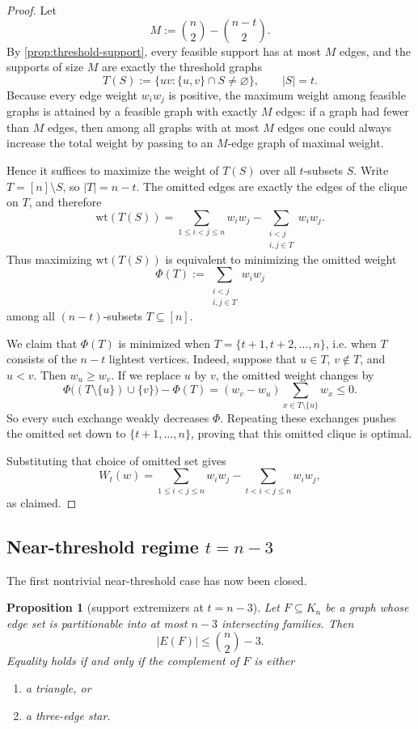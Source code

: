 \documentclass[11pt]{article}
\newtheorem{proposition}[theorem]{Proposition}
\theoremstyle{definition}
\newcommand{\wt}{\mathrm{wt}}
\begin{document}
\begin{proof}
Let
\[
M:=\binom n2-\binom{n-t}{2}.
\]
By \cref{prop:threshold-support}, every feasible support has at most \(M\) edges, and the supports of size \(M\) are exactly the threshold graphs
\[
T(S):=\{uv:\{u,v\}\cap S\neq\varnothing\},
\qquad |S|=t.
\]
Because every edge weight \(w_iw_j\) is positive, the maximum weight among feasible graphs is attained by a feasible graph with exactly \(M\) edges: if a graph had fewer than \(M\) edges, then among all graphs with at most \(M\) edges one could always increase the total weight by passing to an \(M\)-edge graph of maximal weight.

Hence it suffices to maximize the weight of \(T(S)\) over all \(t\)-subsets \(S\). Write \(T=[n]\setminus S\), so \(|T|=n-t\). The omitted edges are exactly the edges of the clique on \(T\), and therefore
\[
\wt(T(S))=\sum_{1\le i<j\le n} w_iw_j-\sum_{\substack{i<j\\ i,j\in T}} w_iw_j.
\]
Thus maximizing \(\wt(T(S))\) is equivalent to minimizing the omitted weight
\[
\Phi(T):=\sum_{\substack{i<j\\ i,j\in T}} w_iw_j
\]
among all \((n-t)\)-subsets \(T\subseteq [n]\).

We claim that \(\Phi(T)\) is minimized when \(T=\{t+1,t+2,\dots,n\}\), i.e. when \(T\) consists of the \(n-t\) lightest vertices. Indeed, suppose that \(u\in T\), \(v\notin T\), and \(u<v\). Then \(w_u\ge w_v\). If we replace \(u\) by \(v\), the omitted weight changes by
\[
\Phi\bigl((T\setminus\{u\})\cup\{v\}\bigr)-\Phi(T)
=(w_v-w_u)\sum_{x\in T\setminus\{u\}} w_x\le 0.
\]
So every such exchange weakly decreases \(\Phi\). Repeating these exchanges pushes the omitted set down to \(\{t+1,\dots,n\}\), proving that this omitted clique is optimal.

Substituting that choice of omitted set gives
\[
W_t(w)=\sum_{1\le i<j\le n} w_iw_j-\sum_{t<i<j\le n} w_iw_j,
\]
as claimed.
\end{proof}

\subsection{Near-threshold regime \(t=n-3\)}
The first nontrivial near-threshold case has now been closed.

\begin{proposition}[support extremizers at \(t=n-3\)]\label{prop:nm3-support}
Let \(F\subseteq K_n\) be a graph whose edge set is partitionable into at most \(n-3\) intersecting families. Then
\[
|E(F)|\le \binom n2-3.
\]
Equality holds if and only if the complement of \(F\) is either
\begin{enumerate}[label=(\roman*)]
    \item a triangle, or
    \item a three-edge star.
\end{enumerate}
\end{proposition}
\end{document}
